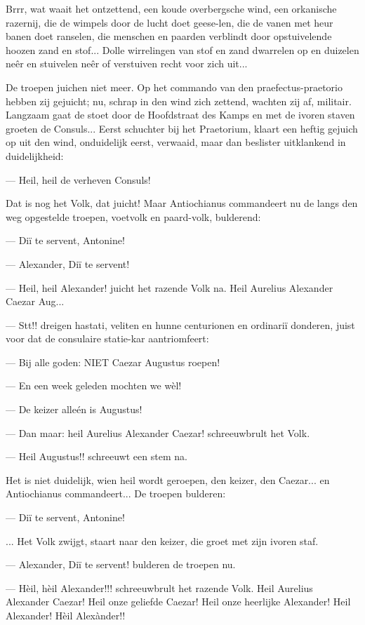 \documentclass[a4paper, 12pt, oneside, dutch]{article}
\begin{document}
Brrr, wat waait het ontzettend, een koude overbergsche wind, een orkanische razernij, die de wimpels door de lucht doet geese-len, die de vanen met heur banen doet ranselen, die menschen en paarden verblindt door opstuivelende hoozen zand en stof... Dolle wirrelingen van stof en zand dwarrelen op en duizelen neêr en stuivelen neêr of verstuiven recht voor zich uit...

De troepen juichen niet meer. Op het commando van den praefectus-praetorio hebben zij gejuicht; nu, schrap in den wind zich zettend, wachten zij af, militair. Langzaam gaat de stoet door de Hoofdstraat des Kamps en met de ivoren staven groeten de Consuls... Eerst schuchter bij het Praetorium, klaart een heftig gejuich op uit den wind, onduidelijk eerst, verwaaid, maar dan beslister uitklankend in duidelijkheid:

--- Heil, heil de verheven Consuls!

Dat is nog het Volk, dat juicht! Maar Antiochianus commandeert nu de langs den weg opgestelde troepen, voetvolk en paard-volk, bulderend:

--- Diï te servent, Antonine!

--- Alexander, Diï te servent!

--- Heil, heil Alexander! juicht het razende Volk na. Heil Aurelius Alexander Caezar Aug...

--- Stt!! dreigen hastati, veliten en hunne centurionen en ordinariï donderen, juist voor dat de consulaire statie-kar aantriomfeert:

--- Bij alle goden: NIET Caezar Augustus roepen!

--- En een week geleden mochten we wèl!

--- De keizer alleén is Augustus!

--- Dan maar: heil Aurelius Alexander Caezar! schreeuwbrult het Volk.

--- Heil Augustus!! schreeuwt een stem na.

Het is niet duidelijk, wien heil wordt geroepen, den keizer, den Caezar... en Antiochianus commandeert... De troepen bulderen:

--- Diï te servent, Antonine!

... Het Volk zwijgt, staart naar den keizer, die groet met zijn ivoren staf.

--- Alexander, Diï te servent! bulderen de troepen nu.

--- Hèil, hèil Alexander!!! schreeuwbrult het razende Volk. Heil Aurelius Alexander Caezar! Heil onze geliefde Caezar! Heil onze heerlijke Alexander! Heil Alexander! Hèil Alexànder!!
\end{document}
